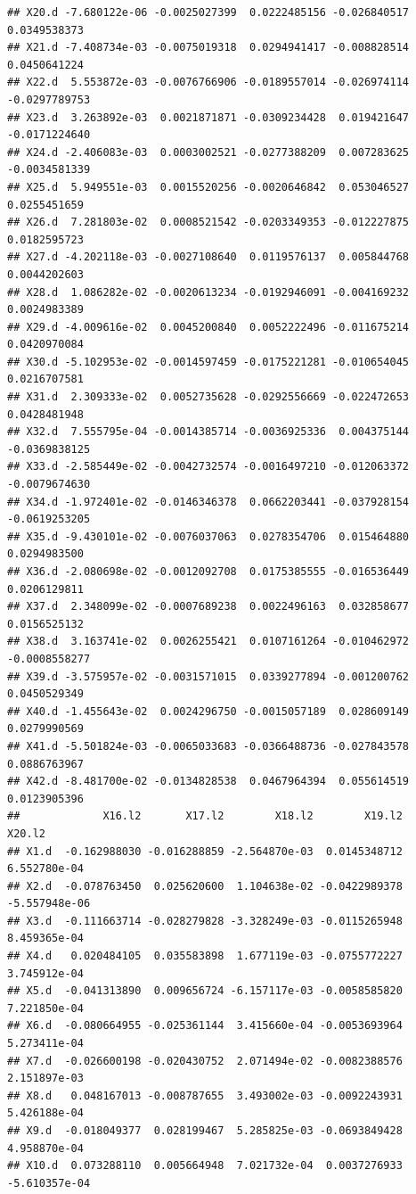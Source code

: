 \documentclass[]{article}
\begin{document}
\begin{verbatim}
## X20.d -7.680122e-06 -0.0025027399  0.0222485156 -0.026840517  0.0349538373
## X21.d -7.408734e-03 -0.0075019318  0.0294941417 -0.008828514  0.0450641224
## X22.d  5.553872e-03 -0.0076766906 -0.0189557014 -0.026974114 -0.0297789753
## X23.d  3.263892e-03  0.0021871871 -0.0309234428  0.019421647 -0.0171224640
## X24.d -2.406083e-03  0.0003002521 -0.0277388209  0.007283625 -0.0034581339
## X25.d  5.949551e-03  0.0015520256 -0.0020646842  0.053046527  0.0255451659
## X26.d  7.281803e-02  0.0008521542 -0.0203349353 -0.012227875  0.0182595723
## X27.d -4.202118e-03 -0.0027108640  0.0119576137  0.005844768  0.0044202603
## X28.d  1.086282e-02 -0.0020613234 -0.0192946091 -0.004169232  0.0024983389
## X29.d -4.009616e-02  0.0045200840  0.0052222496 -0.011675214  0.0420970084
## X30.d -5.102953e-02 -0.0014597459 -0.0175221281 -0.010654045  0.0216707581
## X31.d  2.309333e-02  0.0052735628 -0.0292556669 -0.022472653  0.0428481948
## X32.d  7.555795e-04 -0.0014385714 -0.0036925336  0.004375144 -0.0369838125
## X33.d -2.585449e-02 -0.0042732574 -0.0016497210 -0.012063372 -0.0079674630
## X34.d -1.972401e-02 -0.0146346378  0.0662203441 -0.037928154 -0.0619253205
## X35.d -9.430101e-02 -0.0076037063  0.0278354706  0.015464880  0.0294983500
## X36.d -2.080698e-02 -0.0012092708  0.0175385555 -0.016536449  0.0206129811
## X37.d  2.348099e-02 -0.0007689238  0.0022496163  0.032858677  0.0156525132
## X38.d  3.163741e-02  0.0026255421  0.0107161264 -0.010462972 -0.0008558277
## X39.d -3.575957e-02 -0.0031571015  0.0339277894 -0.001200762  0.0450529349
## X40.d -1.455643e-02  0.0024296750 -0.0015057189  0.028609149  0.0279990569
## X41.d -5.501824e-03 -0.0065033683 -0.0366488736 -0.027843578  0.0886763967
## X42.d -8.481700e-02 -0.0134828538  0.0467964394  0.055614519  0.0123905396
##             X16.l2       X17.l2        X18.l2        X19.l2        X20.l2
## X1.d  -0.162988030 -0.016288859 -2.564870e-03  0.0145348712  6.552780e-04
## X2.d  -0.078763450  0.025620600  1.104638e-02 -0.0422989378 -5.557948e-06
## X3.d  -0.111663714 -0.028279828 -3.328249e-03 -0.0115265948  8.459365e-04
## X4.d   0.020484105  0.035583898  1.677119e-03 -0.0755772227  3.745912e-04
## X5.d  -0.041313890  0.009656724 -6.157117e-03 -0.0058585820  7.221850e-04
## X6.d  -0.080664955 -0.025361144  3.415660e-04 -0.0053693964  5.273411e-04
## X7.d  -0.026600198 -0.020430752  2.071494e-02 -0.0082388576  2.151897e-03
## X8.d   0.048167013 -0.008787655  3.493002e-03 -0.0092243931  5.426188e-04
## X9.d  -0.018049377  0.028199467  5.285825e-03 -0.0693849428  4.958870e-04
## X10.d  0.073288110  0.005664948  7.021732e-04  0.0037276933 -5.610357e-04

\end{verbatim}
\end{document}
